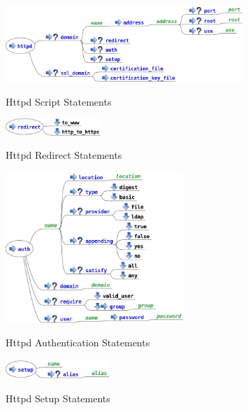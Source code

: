 \begin{figure}[htp]
\centering
\includegraphics[width=0.8\textwidth]{httpd_service_script}
\label{fig:httpd_service_script}
\caption{Httpd Script Statements}
\end{figure}

\begin{figure}[htp]
\centering
\includegraphics[width=0.32\textwidth]{httpd_redirect_script}
\label{fig:httpd_redirect_script}
\caption{Httpd Redirect Statements}
\end{figure}

\begin{figure}[htp]
\centering
\includegraphics[width=0.6\textwidth]{httpd_auth_script}
\label{fig:httpd_auth_script}
\caption{Httpd Authentication Statements}
\end{figure}


\begin{figure}[htp]
\centering
\includegraphics[width=0.35\textwidth]{httpd_setup_script}
\label{fig:httpd_setup_script}
\caption{Httpd Setup Statements}
\end{figure}
